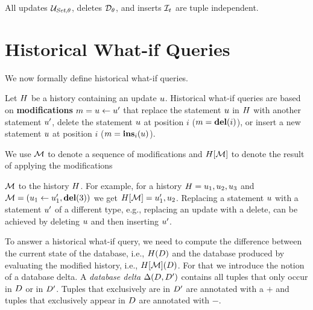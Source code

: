 \begin{lem}\label{lem:tuple-independent-operator}
All updates $\mathcal{U}_{\textit{Set},\theta}$, deletes $\mathcal{D}_{\theta}$, and inserts $\mathcal{I}_{t}$ are tuple independent.
\end{lem}

\iftechreport{}




\section{Historical What-if Queries}
\label{sec:whif-def}

We now formally define historical what-if queries. 

Let $H$ be a history containing an update $u$.
Historical what-if queries are based on \textbf{modifications} $m = u \gets u'$ that replace the statement $u$ in $H$ with another statement $u'$, delete the statement $u$ at position $i$ ($m = \mathbf{del}(i)$), or insert a new statement $u$ at position $i$ ($m = \mathbf{ins}_{i}(u)$).

We use $\mathcal{M}$ to denote a sequence of modifications and $H[\mathcal{M}]$ to denote the result of applying the modifications

$\mathcal{M}$ to the history $H$. For example, for a history $H = u_1, u_2, u_3$ and $\mathcal{M} = (u_1 \gets u_1', \mathbf{del}(3))$ we get $H[\mathcal{M}] = u_1', u_2$. 
Replacing a statement $u$ with a statement $u'$ of a different type, e.g., replacing an update with a delete, can be achieved by deleting $u$ and then inserting $u'$.


To answer a historical what-if query, we need to compute the difference between the current state of the database, i.e., $H(D)$ and the database produced by evaluating the modified history, i.e., $H[\mathcal{M}](D)$.
For that we introduce the notion of a database delta.
A \emph{database delta} $\Delta(D,D')$ contains all tuples that only occur in $D$ or in $D'$. Tuples that exclusively are in $D'$ are annotated with a $+$ and tuples that exclusively appear in $D$ are annotated with $-$.  



